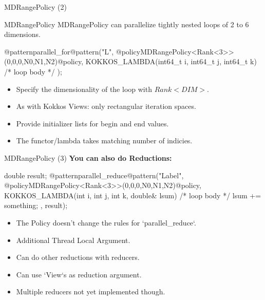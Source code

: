 \begin{frame}[fragile]{MDRangePolicy (2)}

\begin{block}{MDRangePolicy}
   MDRangePolicy can parallelize tightly nested loops of 2 to 6 dimensions.
\end{block}

	\vspace{0.5cm}

  \begin{code}[linebackgroundcolor={
        \btLstHL<1->{3}{bodyColor}
      },
      frame=single
    ]
@patternparallel_for@pattern("L", @policyMDRangePolicy<Rank<3>>({0,0,0},{N0,N1,N2})@policy, 
   KOKKOS_LAMBDA(int64_t i, int64_t j, int64_t k) {
     /* loop body */
});
  \end{code}

\begin{itemize}
   \item<2-> Specify the dimensionality of the loop with $Rank<DIM>$.
   \item<3-> As with Kokkos Views: only rectangular iteration spaces.
   \item<4-> Provide initializer lists for begin and end values.
   \item<5-> The functor/lambda takes matching number of indicies. 
\end{itemize}
\end{frame}

\begin{frame}[fragile]{MDRangePolicy (3)}
   \textbf{You can also do Reductions:}

  \begin{code}[linebackgroundcolor={
        \btLstHL<1->{5-6}{bodyColor}
      },
      frame=single
    ]
double result;
@patternparallel_reduce@pattern("Label", 
  @policyMDRangePolicy<Rank<3>>({0,0,0},{N0,N1,N2})@policy, 
  KOKKOS_LAMBDA(int i, int j, int k, double& lsum) {
     /* loop body */
  lsum += something;
}, result);
  \end{code}

\begin{itemize}
   \item<2-> The Policy doesn't change the rules for `parallel\_reduce`.
   \item<3-> Additional Thread Local Argument.
   \item<4-> Can do other reductions with reducers.
   \item<5-> Can use `View`s as reduction argument.
   \item<6-> Multiple reducers not yet implemented though.
\end{itemize}
\end{frame}

